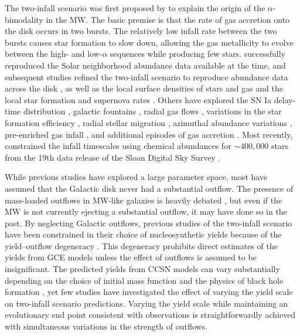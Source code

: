 \documentclass[twocolumn,twocolappendix]{aastex701}
\begin{document}
The two-infall scenario was first proposed by \citet{chiappini_chemical_1997} to explain the origin of the $\alpha$-bimodality in the MW. The basic premise is that the rate of gas accretion onto the disk occurs in two bursts. The relatively low infall rate between the two bursts causes star formation to slow down, allowing the gas metallicity to evolve between the high- and low-$\alpha$ sequences while producing few stars. \citet{chiappini_chemical_1997} successfully reproduced the Solar neighborhood abundance data available at the time, and subsequent studies refined the two-infall scenario to reproduce abundance data across the disk \citep[e.g.,][]{chiappini_abundance_2001,chiappini_oxygen_2003}, as well as the local surface densities of stars and gas and the local star formation and supernova rates \citep[e.g.,][]{romano_mass_2000,spitoni_galactic_2020,spitoni_remind_2024}. Others have explored the SN Ia delay-time distribution \citep{matteucci_effect_2009,palicio_analytic_2023}, galactic fountains \citep{spitoni_effects_2009}, radial gas flows \citep{spitoni_effects_2011,palla_chemical_2020}, variations in the star formation efficiency \citep{spitoni_effects_2011,palla_chemical_2020}, radial stellar migration \citep{spitoni_effect_2015,palla_mgfe_2022}, azimuthal abundance variations \citep{spitoni_2d_2019}, pre-enriched gas infall \citep{palla_chemical_2020,spitoni_remind_2024}, and additional episodes of gas accretion \citep{spitoni_beyond_2023,palla_mapping_2024}. Most recently, \citet{hegedus_reconstructing_2025} constrained the infall timescales using chemical abundances for $\sim400,000$ stars from the 19th data release of the Sloan Digital Sky Survey \citep[SDSS;][]{sdss_collaboration_nineteenth_2025}.

While previous studies have explored a large parameter space, most have assumed that the Galactic disk never had a substantial outflow. The presence of mass-loaded outflows in MW-like galaxies is heavily debated \citep[see discussion in][]{johnson_milky_2025}, but even if the MW is not currently ejecting a substantial outflow, it may have done so in the past. By neglecting Galactic outflows, previous studies of the two-infall scenario have been constrained in their choice of nucleosynthetic yields \citep{francois_evolution_2004} because of the yield--outflow degeneracy \citep[e.g.,][]{hartwick_chemical_1976,weinberg_equilibrium_2017,cooke_primordial_2022,johnson_dwarf_2023,sandford_strong_2024}. This degeneracy prohibits direct estimates of the yields from GCE models unless the effect of outflows is assumed to be insignificant. The predicted yields from CCSN models can vary substantially depending on the choice of initial mass function \citep{vincenzo_modern_2016} and the physics of black hole formation \citep{griffith_impact_2021}, yet few studies have investigated the effect of varying the yield scale on two-infall scenario predictions. Varying the yield scale while maintaining an evolutionary end point consistent with observations is straightforwardly achieved with simultaneous variations in the strength of outflows.
\end{document}
